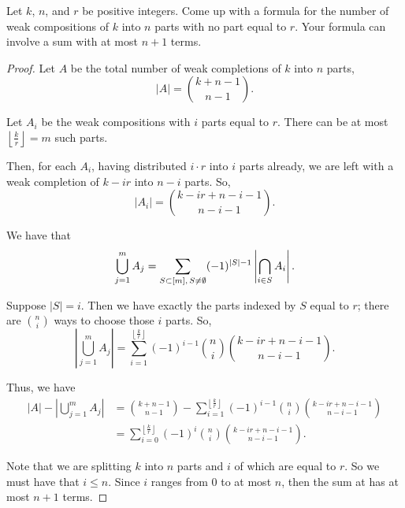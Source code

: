 \documentclass{subfiles}
\begin{document}
\begin{problem}
Let $k$, $n$, and $r$ be positive integers. Come up with a formula for the number of weak compositions of $k$ into $n$ parts with no part equal to $r$. Your formula can involve a sum with at most $n+1$ terms.
\end{problem}
\begin{proof}
	Let $A$ be the total number of weak completions of $k$ into $n$ parts,  \[
		|A| =\binom{k + n-1}{n-1}
		.\]

	Let $A_i$ be the weak compositions with $i$ parts equal to $r$.
	There can be at most $\left\lfloor \frac{k}{r} \right\rfloor = m$ such parts.

	Then, for each $A_i$, having distributed $i\cdot r$ into $i$ parts already, we are left with a weak completion of $k-ir$ into $n-i$ parts.
	So,  \[
		|A_i| = \binom{k-ir+n-i-1}{n-i-1}
		.\]

	We have that \[
		\bigcup_{j=1}^{m} A_j = \sum_{S\subset [m],\, S\neq \emptyset} (-1)^{|S| - 1} \left| \bigcap_{i\in S}A_i \right|
		.\]

	Suppose $|S| = i$.
	Then we have exactly the parts indexed by $S$ equal to $r$;
	there are $\binom{n}{i}$ ways to choose those $i$ parts.
	So,  \[
		\left|\bigcup_{j=1}^{m} A_j \right| = \sum_{i=1}^{\left\lfloor \frac{k}{r} \right\rfloor} (-1)^{i - 1}\binom{n}{i} \binom{k-ir+n-i-1}{n-i-1}
		.\]

	Thus, we have
	\begin{align*}
		|A| - \left| \bigcup_{j=1}^{m} A_j \right| & = \binom{k+n-1}{n-1}-\sum_{i=1}^{\left\lfloor \frac{k}{r} \right\rfloor} (-1)^{i - 1}\binom{n}{i} \binom{k-ir+n-i-1}{n-i-1} \\
		                                           & = \sum_{i=0}^{\left\lfloor \frac{k}{r} \right\rfloor} (-1)^{i}\binom{n}{i} \binom{k-ir+n-i-1}{n-i-1}
		.\end{align*}

	Note that we are splitting $k$ into  $n$ parts and  $i$ of which are equal to  $r$.
	So we must have that  $i\le n$.
	Since $i$ ranges from 0 to at most $n$, then the sum at has at most  $n+1$ terms.
\end{proof}
\end{document}
